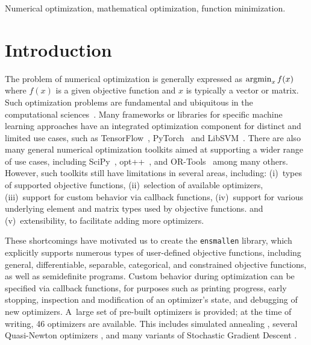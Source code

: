 \documentclass[twoside,11pt]{article}
\begin{document}
\begin{keywords}
  Numerical optimization, mathematical optimization, function minimization.
\end{keywords}


\section{Introduction}

The problem of numerical optimization is generally expressed as
$\operatornamewithlimits{argmin}_x f(x)$
where $f(x)$ is a given objective function and $x$ is typically a vector or matrix.
Such optimization problems are fundamental and ubiquitous in the computational sciences~\citep{Nocedal_2006}.
Many frameworks or libraries for specific machine learning approaches
have an integrated optimization component for distinct and limited use cases,
such as
TensorFlow~\citep{TensorFlow_arXiv_2016},
PyTorch~\citep{PyTorch_NeurIPS_2019}
and LibSVM~\citep{libsvm2011}.
There are also many general numerical optimization toolkits
aimed at supporting a wider range of use cases,
including SciPy~\citep{SciPy_NMeth_2020},
opt++~\citep{meza1994opt++},
and 
OR-Tools~\citep{ortools} among many others.
However, such toolkits still have limitations in several areas,
including:
(i)~types of supported objective functions,
(ii)~selection of available optimizers,
(iii)~support for custom behavior via callback functions,
(iv)~support for various underlying element and matrix types used by objective functions.
and
(v)~extensibility, to facilitate adding more optimizers.

These shortcomings have motivated us to create the {\tt ensmallen} library,
which explicitly supports numerous types of user-defined objective functions,
including general, differentiable, separable, categorical, and constrained
objective functions, as well as semidefinite programs.
Custom behavior during optimization can be specified via {callback} functions,
for purposes such as printing progress, early stopping, inspection and modification of an optimizer's state,
and debugging of new optimizers.
A~large set of pre-built optimizers is provided;
at the time of writing, 46 optimizers are available.
This includes 
simulated annealing \citep{kirkpatrick1983optimization},
several Quasi-Newton optimizers \citep{liu1989limited,mokhtari2018},
and many variants of Stochastic Gradient Descent \citep{Ruder_2016}.
\end{document}
